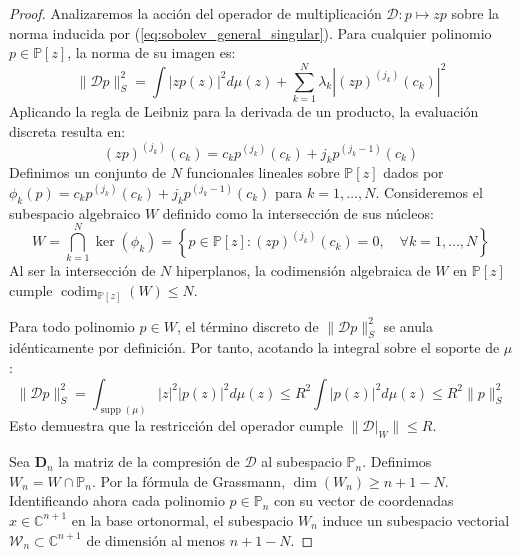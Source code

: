 \documentclass[12pt,a4paper]{article}
\theoremstyle{definition}
\theoremstyle{remark}
\newcommand{\Poly}{\mathbb{P}[z]}
\newcommand{\D}{\mathcal{D}}
\begin{document}
\begin{proof}
  Analizaremos la acción del operador de multiplicación $\D: p \mapsto zp$ sobre la norma inducida por (\ref{eq:sobolev_general_singular}). Para cualquier polinomio $p \in \Poly$, la norma de su imagen es:
  \begin{equation}
    \|\D p\|_S^2 = \int |zp(z)|^2 d\mu(z) + \sum_{k=1}^N \lambda_k \left| (zp)^{(j_k)}(c_k) \right|^2
  \end{equation}
  Aplicando la regla de Leibniz para la derivada de un producto, la evaluación discreta resulta en:
  \begin{equation}\label{eq:leibniz_eval}
    (zp)^{(j_k)}(c_k) = c_k p^{(j_k)}(c_k) + j_k p^{(j_k-1)}(c_k)
  \end{equation}
  Definimos un conjunto de $N$ funcionales lineales sobre $\Poly$ dados por $\phi_k(p) = c_k p^{(j_k)}(c_k) + j_k p^{(j_k-1)}(c_k)$ para $k=1,\dots,N$. Consideremos el subespacio algebraico $W$ definido como la intersección de sus núcleos:
  \begin{equation}
    W = \bigcap_{k=1}^N \ker(\phi_k) = \left\{ p \in \Poly : (zp)^{(j_k)}(c_k) = 0, \quad \forall k=1,\dots,N \right\}
  \end{equation}
  Al ser la intersección de $N$ hiperplanos, la codimensión algebraica de $W$ en $\Poly$ cumple $\operatorname{codim}_{\Poly}(W) \le N$.

  Para todo polinomio $p \in W$, el término discreto de $\|\D p\|_S^2$ se anula idénticamente por definición. Por tanto, acotando la integral sobre el soporte de $\mu$:
  \begin{equation}
    \|\D p\|_S^2 = \int_{\operatorname{supp}(\mu)} |z|^2 |p(z)|^2 d\mu(z) \le R^2 \int |p(z)|^2 d\mu(z) \le R^2 \|p\|_S^2
  \end{equation}
  Esto demuestra que la restricción del operador cumple $\|\D|_W\| \le R$.

  Sea $\mathbf{D}_n$ la matriz de la compresión de $\D$ al subespacio $\mathbb{P}_{n}$. Definimos $W_n = W \cap \mathbb{P}_{n}$. Por la fórmula de Grassmann, $\dim(W_n) \ge n+1 - N$. Identificando ahora cada polinomio $p \in \mathbb{P}_{n}$ con su vector de coordenadas $x \in \mathbb{C}^{n+1}$ en la base ortonormal, el subespacio $W_n$ induce un subespacio vectorial $\mathcal{W}_n \subset \mathbb{C}^{n+1}$ de dimensión al menos $n+1-N$.


\end{proof}
\end{document}
